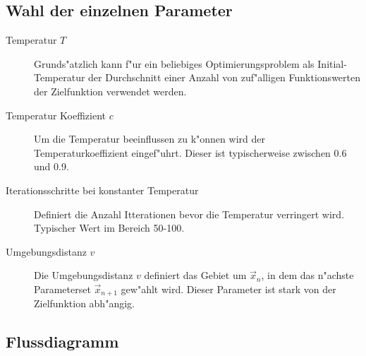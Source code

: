 \subsection{Wahl der einzelnen Parameter}
\begin{description}
\item [Temperatur $T$] $ $\\
	Grunds"atzlich kann f"ur ein beliebiges Optimierungsproblem als Initial-Temperatur der Durchschnitt einer Anzahl von zuf"alligen Funktionswerten der Zielfunktion verwendet werden.
\item [Temperatur Koeffizient $c$] $ $\\
	Um die Temperatur beeinflussen zu k"onnen wird der Temperaturkoeffizient eingef"uhrt. Dieser ist typischerweise zwischen 0.6 und 0.9.

\item [Iterationsschritte bei konstanter Temperatur]$ $\\
	Definiert die Anzahl Itterationen bevor die Temperatur verringert wird. Typischer Wert im Bereich 50-100.

\item [Umgebungsdistanz $v$]$ $\\
	Die Umgebungsdistanz $v$ definiert das Gebiet um $\vec{x}_{n}$, in dem das n"achste Parameterset $\vec{x}_{n+1}$ gew"ahlt wird. Dieser Parameter ist stark von der Zielfunktion abh"angig.
\end{description}
		
\clearpage


\subsection{Flussdiagramm}

